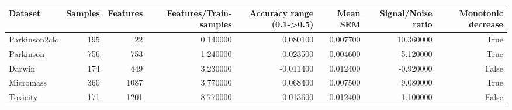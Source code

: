 \begin{tabular}{lrrrrrrr}
\toprule
Dataset & Samples & Features & Features/Train-samples & Accuracy range (0.1->0.5) & Mean SEM & Signal/Noise ratio & Monotonic decrease \\
\midrule
Parkinson2clc & 195 & 22 & 0.140000 & 0.080100 & 0.007700 & 10.360000 & True \\
Parkinson & 756 & 753 & 1.240000 & 0.023500 & 0.004600 & 5.120000 & True \\
Darwin & 174 & 449 & 3.230000 & -0.011400 & 0.012400 & -0.920000 & False \\
Micromass & 360 & 1087 & 3.770000 & 0.068400 & 0.007500 & 9.080000 & True \\
Toxicity & 171 & 1201 & 8.770000 & 0.013600 & 0.012400 & 1.100000 & False \\
\bottomrule
\end{tabular}
